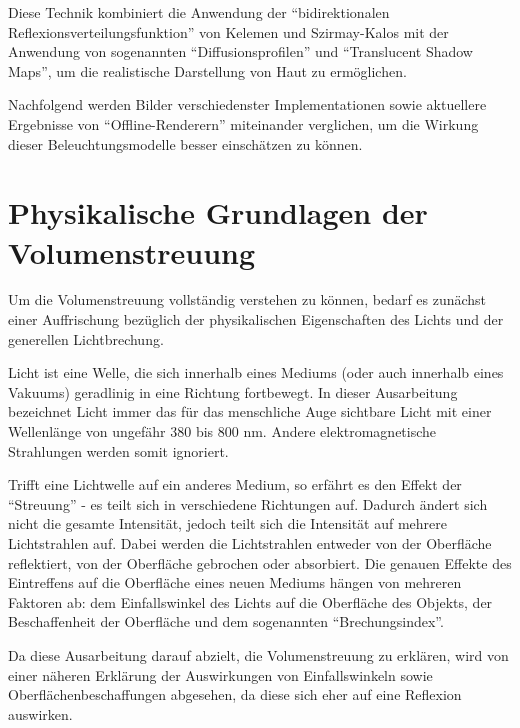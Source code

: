 \documentclass[ngerman,runningheads,a4paper]{llncs}[2018/03/10]
\begin{document}
Diese Technik kombiniert die Anwendung der \enquote{bidirektionalen Reflexions\-verteilungs\-funktion} von Kelemen und Szirmay-Kalos mit der Anwendung von sogenannten \enquote{Diffusionsprofilen} und \enquote{Translucent Shadow Maps}, um die realistische Darstellung von Haut zu ermöglichen.

Nachfolgend werden Bilder verschiedenster Implementationen sowie aktuellere Ergebnisse von \enquote{Offline-Renderern} miteinander verglichen, um die Wirkung dieser Beleuchtungsmodelle besser einschätzen zu können.

\section{Physikalische Grundlagen der Volumenstreuung}

Um die Volumenstreuung vollständig verstehen zu können, bedarf es zunächst einer Auffrischung bezüglich der physikalischen Eigenschaften des Lichts und der generellen Lichtbrechung.

Licht ist eine Welle, die sich innerhalb eines Mediums (oder auch innerhalb eines Vakuums) geradlinig in eine Richtung fortbewegt.
In dieser Ausarbeitung bezeichnet Licht immer das für das menschliche Auge sichtbare Licht mit einer Wellenlänge von ungefähr 380 bis 800 nm. Andere elektromagnetische Strahlungen werden somit ignoriert.

Trifft eine Lichtwelle auf ein anderes Medium, so erfährt es den Effekt der \enquote{Streuung} - es teilt sich in verschiedene Richtungen auf. Dadurch ändert sich nicht die gesamte Intensität, jedoch teilt sich die Intensität auf mehrere Lichtstrahlen auf.
Dabei werden die Lichtstrahlen entweder von der Oberfläche reflektiert, von der Oberfläche gebrochen oder absorbiert.
Die genauen Effekte des Eintreffens auf die Oberfläche eines neuen Mediums hängen von mehreren Faktoren ab: dem Einfallswinkel des Lichts auf die Oberfläche des Objekts, der Beschaffenheit der Oberfläche und dem sogenannten \enquote{Brechungsindex}.

Da diese Ausarbeitung darauf abzielt, die Volumenstreuung zu erklären, wird von einer näheren Erklärung der Auswirkungen von Einfallswinkeln sowie Oberflächenbeschaffungen abgesehen, da diese sich eher auf eine Reflexion auswirken.
\end{document}
